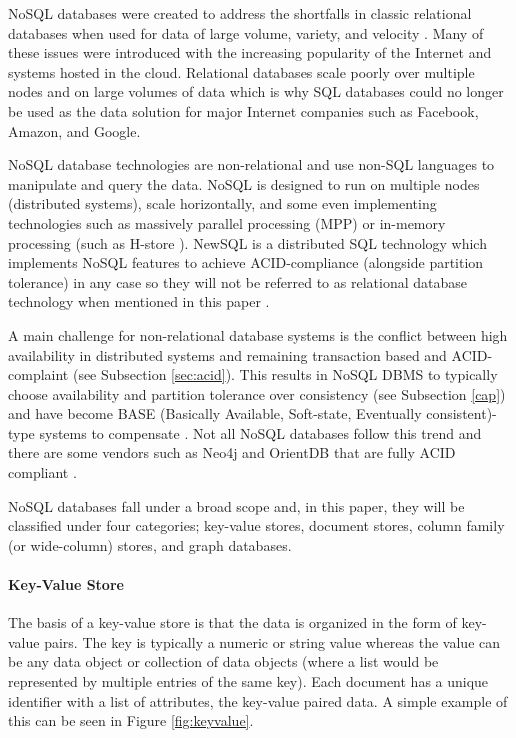 NoSQL databases were created to address the shortfalls in classic relational databases when used for data of large volume, variety, and velocity \cite{nosql-db}. Many of these issues were introduced with the increasing popularity of the Internet and systems hosted in the cloud. Relational databases scale poorly over multiple nodes and on large volumes of data which is why SQL databases could no longer be used as the data solution for major Internet companies such as Facebook, Amazon, and Google.

NoSQL database technologies are non-relational and use non-SQL languages to manipulate and query the data. NoSQL is designed to run on multiple nodes (distributed systems), scale horizontally, and some even implementing technologies such as massively parallel processing (MPP) \cite{tigergraph-mpp} or in-memory processing (such as H-store \cite{hstore}). NewSQL is a distributed SQL technology which implements NoSQL features to achieve ACID-compliance (alongside partition tolerance) in any case so they will not be referred to as relational database technology when mentioned in this paper \cite{nosql-db}.

A main challenge for non-relational database systems is the conflict between high availability in distributed systems and remaining transaction based and ACID-complaint (see Subsection \ref{sec:acid}). This results in NoSQL DBMS to typically choose availability and partition tolerance over consistency (see Subsection \ref{cap}) and have become BASE (Basically Available, Soft-state, Eventually consistent)-type systems to compensate \cite{base}. Not all NoSQL databases follow this trend and there are some vendors such as Neo4j and OrientDB that are fully ACID compliant \cite{acid}.

NoSQL databases fall under a broad scope and, in this paper, they will be classified under four categories; key-value stores, document stores, column family (or wide-column) stores, and graph databases.

\paragraph{Key-Value Store}

The basis of a key-value store is that the data is organized in the form of key-value pairs. The key is typically a numeric or string value whereas the value can be any data object or collection of data objects (where a list would be represented by multiple entries of the same key). Each document has a unique identifier with a list of attributes, the key-value paired data. A simple example of this can be seen in Figure \ref{fig:keyvalue}.

